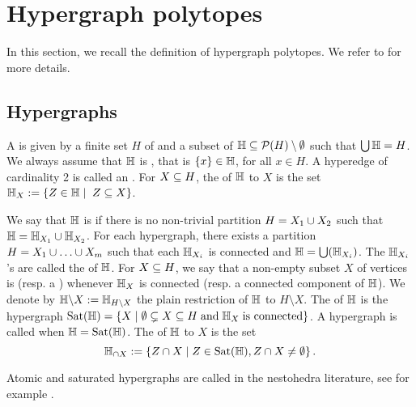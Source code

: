 
\section{Hypergraph polytopes} 
\label{s:hypergraph}

In this section, we recall the definition of hypergraph polytopes. 
We refer to \cite{DP-HP,COI} for more details. 


\subsection{Hypergraphs}
A  is given by a finite set $H$ of  and a subset of  ${\mathbb H}\subseteq {\cal P}(H)\setminus\emptyset$ such that $\bigcup {\mathbb H}=H$. 
We always assume that ${\mathbb H}$ is , that is $\left\{x\right\}\in {\mathbb H}$, for all $x\in H$. 
A hyperedge of cardinality 2 is called an .  
For $X\subseteq H$, the  of ${\mathbb H}$ to $X$ is the set 
${\mathbb H}_X := \left\{Z\in {\mathbb H} \mid \; Z\subseteq X\right\}$.

We say that ${\mathbb H}$ is  if there is no non-trivial partition $H=X_1\cup X_2$ such that ${\mathbb H}={\mathbb H}_{X_1}\cup {\mathbb H}_{X_2}$. 
For each hypergraph, there exists a partition $H=X_1\cup\ldots\cup X_m$ such that each ${\mathbb H}_{X_i}$ is connected and ${\mathbb H}=\bigcup({\mathbb H}_{X_i})$.  
The ${\mathbb H}_{X_i}$'s are called the  of ${\mathbb H}$.
For $X\subseteq H$, we say that a non-empty subset $X$ of vertices is  (resp. a ) whenever ${\mathbb H}_X$ is connected (resp. a connected component of ${\mathbb H}$).  
We denote by ${\mathbb H}\backslash X:={\mathbb H}_{H\setminus X}$ the plain restriction of ${\mathbb H}$ to $H \setminus X$.
The  of ${\mathbb H}$ is the hypergraph
$\operatorname{Sat}({\mathbb H})=\left\{X \mid \emptyset\subsetneq X\subseteq H\;\mbox{and}\;{\mathbb H}_X\;\mbox{is connected}\right\}$.
A hypergraph is called  when ${\mathbb H}=\operatorname{Sat}({\mathbb H})$.  
The  of ${\mathbb H}$ to $X$ is the set $${\mathbb H}_{\cap X}:=\left\{Z\cap X \mid Z\in \operatorname{Sat}({\mathbb H}), Z\cap X\neq\emptyset\right\}.$$

\begin{rem}
    Atomic and saturated hypergraphs are called  in the nestohedra literature, see for example \cite{P09,FS05}.
\end{rem}


